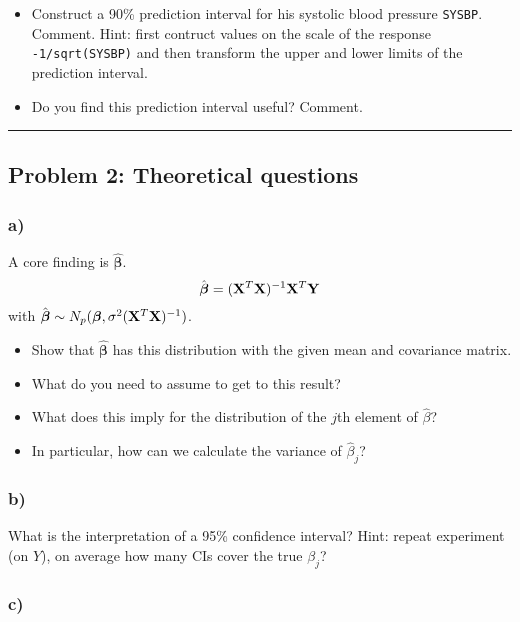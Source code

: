 \documentclass[]{article}
\providecommand{\tightlist}{%
  \setlength{\itemsep}{0pt}\setlength{\parskip}{0pt}}
\begin{document}
\begin{itemize}
\tightlist
\item
  Construct a 90\% prediction interval for his systolic blood pressure
  \texttt{SYSBP}. Comment. Hint: first contruct values on the scale of
  the response \texttt{-1/sqrt(SYSBP)} and then transform the upper and
  lower limits of the prediction interval.
\item
  Do you find this prediction interval useful? Comment.
\end{itemize}

\begin{center}\rule{0.5\linewidth}{\linethickness}\end{center}

\subsection{Problem 2: Theoretical
questions}\label{problem-2-theoretical-questions}

\subsubsection{a)}\label{a}

A core finding is \(\hat{\boldsymbol\beta}\).
\[ \hat{\boldsymbol\beta}=({\bf X}^T{\bf X})^{-1} {\bf X}^T {\bf Y}\]
with
\(\hat{\boldsymbol\beta}\sim N_{p}(\boldsymbol\beta,\sigma^2({\bf X}^T{\bf X})^{-1})\).

\begin{itemize}
\tightlist
\item
  Show that \(\hat{\boldsymbol\beta}\) has this distribution with the
  given mean and covariance matrix.
\item
  What do you need to assume to get to this result?
\item
  What does this imply for the distribution of the \(j\)th element of
  \(\hat{\beta}\)?
\item
  In particular, how can we calculate the variance of \(\hat{\beta}_j\)?
\end{itemize}

\subsubsection{b)}\label{b}

What is the interpretation of a 95\% confidence interval? Hint: repeat
experiment (on \(Y\)), on average how many CIs cover the true
\(\beta_j\)?

\subsubsection{c)}\label{c}
\end{document}
